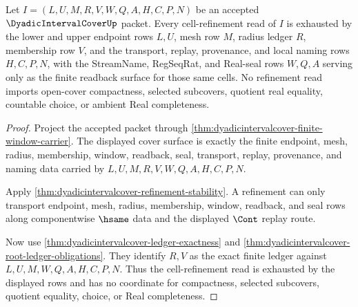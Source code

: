 \begin{theorem}
\label{thm:dyadicintervalcover-cell-refinement-exhaustion}
Let $I=(L,U,M,R,V,W,Q,A,H,C,P,N)$ be an accepted $\DyadicIntervalCoverUp$ packet. Every cell-refinement read of $I$ is exhausted by the lower and upper endpoint rows $L,U$, mesh row $M$, radius ledger $R$, membership row $V$, and the transport, replay, provenance, and local naming rows $H,C,P,N$, with the StreamName, RegSeqRat, and Real-seal rows $W,Q,A$ serving only as the finite readback surface for those same cells. No refinement read imports open-cover compactness, selected subcovers, quotient real equality, countable choice, or ambient Real completeness.
\end{theorem}
\begin{proof}
Project the accepted packet through \autoref{thm:dyadicintervalcover-finite-window-carrier}. The displayed cover surface is exactly the finite endpoint, mesh, radius, membership, window, readback, seal, transport, replay, provenance, and naming data carried by $L,U,M,R,V,W,Q,A,H,C,P,N$.

Apply \autoref{thm:dyadicintervalcover-refinement-stability}. A refinement can only transport endpoint, mesh, radius, membership, window, readback, and seal rows along componentwise $\hsame$ data and the displayed $\Cont$ replay route.

Now use \autoref{thm:dyadicintervalcover-ledger-exactness} and \autoref{thm:dyadicintervalcover-root-ledger-obligations}. They identify $R,V$ as the exact finite ledger against $L,U,M,W,Q,A,H,C,P,N$. Thus the cell-refinement read is exhausted by the displayed rows and has no coordinate for compactness, selected subcovers, quotient equality, choice, or Real completeness.
\end{proof}

